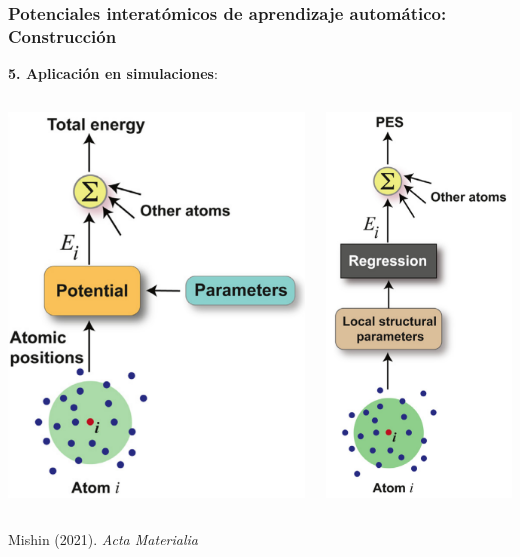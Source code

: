 \documentclass[aspectratio=169]{beamer}
\let\oldtextbf\textbf
\renewcommand{\textbf}[1]{\textcolor{nordblue}{\oldtextbf{#1}}}
\begin{document}
    \begin{frame}
        \frametitle{Potenciales interatómicos de aprendizaje automático: Construcción}
        
        \textbf{5. Aplicación en simulaciones}:

        \begin{columns}
            \begin{center}
                \includegraphics[width=0.5\columnwidth]{intro-ff.png}
            \end{center}
            \begin{center}
                \includegraphics[width=0.3\columnwidth]{intro-ml.png}
            \end{center}
        \end{columns}

        \tiny{Mishin (2021). \textit{Acta Materialia}}

	\end{frame}
\end{document}
